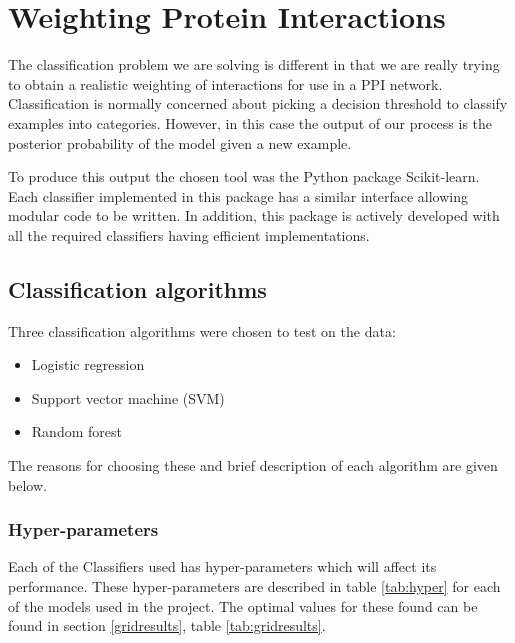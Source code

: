 \section{Weighting Protein Interactions}

The classification problem we are solving is different in that we are really trying to obtain a realistic weighting of interactions for use in a PPI network.
Classification is normally concerned about picking a decision threshold to classify examples into categories.
However, in this case the output of our process is the posterior probability of the model given a new example.

To produce this output the chosen tool was the Python package Scikit-learn\autocite{pedregosa_scikit-learn:_2011}.
Each classifier implemented in this package has a similar interface allowing modular code to be written.
In addition, this package is actively developed with all the required classifiers having efficient implementations.

\subsection{Classification algorithms}

Three classification algorithms were chosen to test on the data:

\begin{itemize}
    \item Logistic regression
    \item Support vector machine (SVM)
    \item Random forest
\end{itemize}

The reasons for choosing these and brief description of each algorithm are given below.

\subsubsection{Hyper-parameters}
Each of the Classifiers used has hyper-parameters which will affect its performance.
These hyper-parameters are described in table \ref{tab:hyper} for each of the models used in the project.
The optimal values for these found can be found in section \ref{gridresults}, table \ref{tab:gridresults}.

